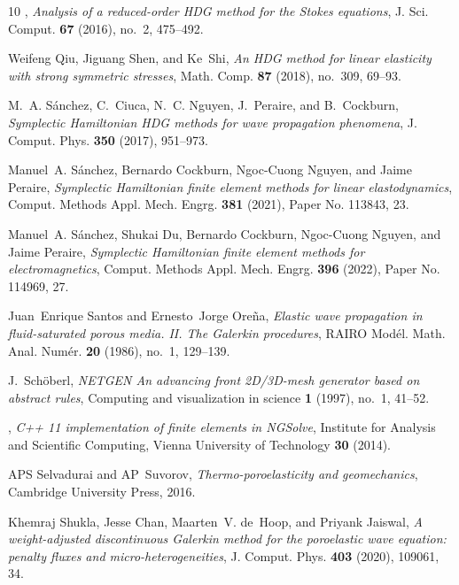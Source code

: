 \documentclass[10pt,letterpaper]{amsart}
\theoremstyle{plain} %
\theoremstyle{remark} %
\begin{document}
\begin{thebibliography}{10}
\bysame, \emph{Analysis of a reduced-order {HDG} method for the {S}tokes
  equations}, J. Sci. Comput. \textbf{67} (2016), no.~2, 475--492. 

Weifeng Qiu, Jiguang Shen, and Ke~Shi, \emph{An {HDG} method for linear
  elasticity with strong symmetric stresses}, Math. Comp. \textbf{87} (2018),
  no.~309, 69--93. 

M.~A. S\'anchez, C.~Ciuca, N.~C. Nguyen, J.~Peraire, and B.~Cockburn,
  \emph{Symplectic {H}amiltonian {HDG} methods for wave propagation phenomena},
  J. Comput. Phys. \textbf{350} (2017), 951--973. 

Manuel~A. S\'anchez, Bernardo Cockburn, Ngoc-Cuong Nguyen, and Jaime Peraire,
  \emph{Symplectic {H}amiltonian finite element methods for linear
  elastodynamics}, Comput. Methods Appl. Mech. Engrg. \textbf{381} (2021),
  Paper No. 113843, 23. 

Manuel~A. S\'anchez, Shukai Du, Bernardo Cockburn, Ngoc-Cuong Nguyen, and Jaime
  Peraire, \emph{Symplectic {H}amiltonian finite element methods for
  electromagnetics}, Comput. Methods Appl. Mech. Engrg. \textbf{396} (2022),
  Paper No. 114969, 27. 

Juan~Enrique Santos and Ernesto~Jorge Ore\~{n}a, \emph{Elastic wave propagation
  in fluid-saturated porous media. {II}. {T}he {G}alerkin procedures}, RAIRO
  Mod\'{e}l. Math. Anal. Num\'{e}r. \textbf{20} (1986), no.~1, 129--139.

J.~Sch{\"o}berl, \emph{{NETGEN} {A}n advancing front 2{D}/3{D}-mesh generator
  based on abstract rules}, Computing and visualization in science \textbf{1}
  (1997), no.~1, 41--52.

\bysame, \emph{C++ 11 implementation of finite elements in {NGSolve}},
  Institute for Analysis and Scientific Computing, Vienna University of
  Technology \textbf{30} (2014).

APS Selvadurai and AP~Suvorov, \emph{Thermo-poroelasticity and geomechanics},
  Cambridge University Press, 2016.

Khemraj Shukla, Jesse Chan, Maarten~V. de~Hoop, and Priyank Jaiswal, \emph{A
  weight-adjusted discontinuous {G}alerkin method for the poroelastic wave
  equation: penalty fluxes and micro-heterogeneities}, J. Comput. Phys.
  \textbf{403} (2020), 109061, 34. 


\end{thebibliography}
\end{document}
